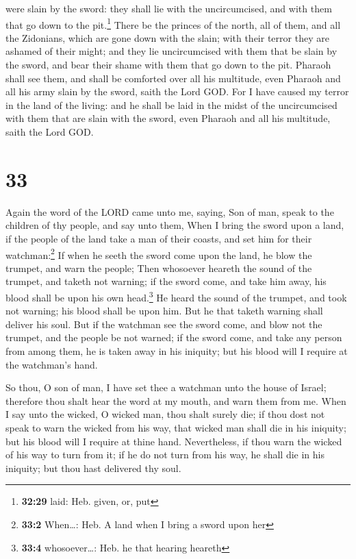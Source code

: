were slain by the sword: they shall lie with the uncircumcised, and with
them that go down to the pit.\footnote{\textbf{32:29} laid: Heb. given,
  or, put}  There be the princes of the north, all of
them, and all the Zidonians, which are gone down with the slain; with
their terror they are ashamed of their might; and they lie uncircumcised
with them that be slain by the sword, and bear their shame with them
that go down to the pit.  Pharaoh shall see them, and
shall be comforted over all his multitude, even Pharaoh and all his army
slain by the sword, saith the Lord GOD.  For I have
caused my terror in the land of the living: and he shall be laid in the
midst of the uncircumcised with them that are slain with the sword, even
Pharaoh and all his multitude, saith the Lord GOD.

\hypertarget{section-32}{%
\section{33}\label{section-32}}

 Again the word of the LORD came unto me, saying,
 Son of man, speak to the children of thy people, and say
unto them, When I bring the sword upon a land, if the people of the land
take a man of their coasts, and set him for their watchman:\footnote{\textbf{33:2}
  When\ldots: Heb. A land when I bring a sword upon her} 
If when he seeth the sword come upon the land, he blow the trumpet, and
warn the people;  Then whosoever heareth the sound of the
trumpet, and taketh not warning; if the sword come, and take him away,
his blood shall be upon his own head.\footnote{\textbf{33:4}
  whosoever\ldots: Heb. he that hearing heareth}  He heard
the sound of the trumpet, and took not warning; his blood shall be upon
him. But he that taketh warning shall deliver his soul. 
But if the watchman see the sword come, and blow not the trumpet, and
the people be not warned; if the sword come, and take any person from
among them, he is taken away in his iniquity; but his blood will I
require at the watchman's hand.

 So thou, O son of man, I have set thee a watchman unto
the house of Israel; therefore thou shalt hear the word at my mouth, and
warn them from me.  When I say unto the wicked, O wicked
man, thou shalt surely die; if thou dost not speak to warn the wicked
from his way, that wicked man shall die in his iniquity; but his blood
will I require at thine hand.  Nevertheless, if thou warn
the wicked of his way to turn from it; if he do not turn from his way,
he shall die in his iniquity; but thou hast delivered thy soul.

